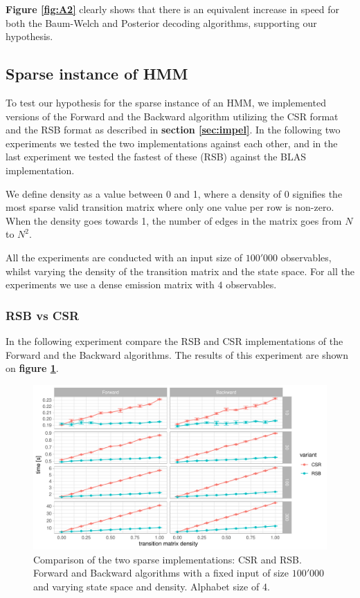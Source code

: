 \textbf{Figure \ref{fig:A2}} clearly shows that there is an equivalent increase in speed for both the Baum-Welch and Posterior decoding algorithms, supporting our hypothesis.

\subsection{Sparse instance of HMM}

To test our hypothesis for the sparse instance of an HMM, we implemented versions of the Forward and the Backward algorithm utilizing the CSR format and the RSB format as described in \textbf{section \ref{sec:impel}}. In the following two experiments we tested the two implementations against each other, and in the last experiment we tested the fastest of these (RSB) against the BLAS implementation.

We define density as a value between 0 and 1, where a density of 0 signifies the most sparse valid transition matrix where only one value per row is non-zero. 
When the density goes towards 1, the number of edges in the matrix goes from $N$ to $N^2$.

All the experiments are conducted with an input size of $100'000$ observables, whilst varying the density of the transition matrix and the state space. For all the experiments we use a dense emission matrix with $4$ observables. 

\subsubsection{RSB vs CSR}

In the following experiment compare the RSB and CSR implementations of the Forward and the Backward algorithms. The results of this experiment are shown on \textbf{figure \ref{fig:B3}}. 

\begin{figure}[H]
  \centering
  \includegraphics[scale=0.85]{figures/figure_B3.pdf}
  \caption{\small{Comparison of the two sparse implementations: CSR and RSB. Forward and Backward algorithms with a fixed input of size $100'000$ and varying state space and density. Alphabet size of 4.}}
  \label{fig:B3}
\end{figure}


